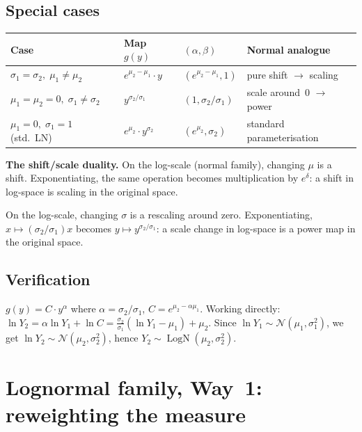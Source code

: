 \documentclass[11pt,a4paper]{article}
\newcommand{\N}{\mathcal{N}}
\newcommand{\LN}{\operatorname{LogN}}
\begin{document}
\subsection{Special cases}

\begin{center}
\begin{tabular}{llll}
\toprule
\textbf{Case} & \textbf{Map }$g(y)$ & $(\alpha,\beta)$ & \textbf{Normal analogue} \\
\midrule
$\sigma_1=\sigma_2,\;\mu_1\ne\mu_2$ & $e^{\mu_2-\mu_1}\cdot y$ & $(e^{\mu_2-\mu_1},1)$ & pure shift $\to$ scaling \\
$\mu_1=\mu_2=0,\;\sigma_1\ne\sigma_2$ & $y^{\sigma_2/\sigma_1}$ & $(1,\sigma_2/\sigma_1)$ & scale around~$0$ $\to$ power \\
$\mu_1=0,\;\sigma_1=1$ (std.\ LN)   & $e^{\mu_2}\cdot y^{\sigma_2}$ & $(e^{\mu_2},\sigma_2)$ & standard parameterisation \\
\bottomrule
\end{tabular}
\end{center}

\medskip\noindent\textbf{The shift/scale duality.}
On the log-scale (normal family), changing $\mu$ is a shift.
Exponentiating, the same operation becomes multiplication by $e^\delta$: a shift in
log-space is scaling in the original space.

On the log-scale, changing $\sigma$ is a rescaling around zero.
Exponentiating, $x\mapsto(\sigma_2/\sigma_1)x$ becomes $y\mapsto y^{\sigma_2/\sigma_1}$:
a scale change in log-space is a power map in the original space.

\subsection{Verification}

$g(y)=C\cdot y^\alpha$ where $\alpha=\sigma_2/\sigma_1$, $C=e^{\mu_2-\alpha\mu_1}$.
Working directly: $\ln Y_2=\alpha\ln Y_1+\ln C=\frac{\sigma_2}{\sigma_1}(\ln Y_1-\mu_1)+\mu_2$.
Since $\ln Y_1\sim\N(\mu_1,\sigma_1^2)$, we get $\ln Y_2\sim\N(\mu_2,\sigma_2^2)$,
hence $Y_2\sim\LN(\mu_2,\sigma_2^2)$. \checkmark

\section{Lognormal family, Way~1: reweighting the measure}
\label{sec:logn-way1}
\end{document}
